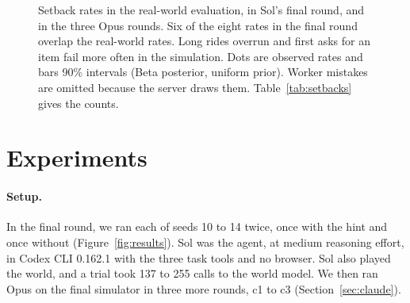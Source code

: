 \documentclass[10pt]{article}
\begin{document}
\begin{figure}[t]
  \caption{Setback rates in the real-world evaluation, in Sol's final round, and in the three Opus rounds. Six of the eight rates in the final round overlap the real-world rates. Long rides overrun and first asks for an item fail more often in the simulation. Dots are observed rates and bars 90\% intervals (Beta posterior, uniform prior). Worker mistakes are omitted because the server draws them. Table~\ref{tab:setbacks} gives the counts.}
  \label{fig:setbacks}
\end{figure}

\section{Experiments}
\label{sec:results}

\paragraph{Setup.} In the final round, we ran each of seeds 10 to 14 twice, once with the hint and once without (Figure~\ref{fig:results}). Sol was the agent, at medium reasoning effort, in Codex CLI 0.162.1 with the three task tools and no browser. Sol also played the world, and a trial took 137 to 255 calls to the world model. We then ran Opus on the final simulator in three more rounds, c1 to c3 (Section~\ref{sec:claude}).
\end{document}

